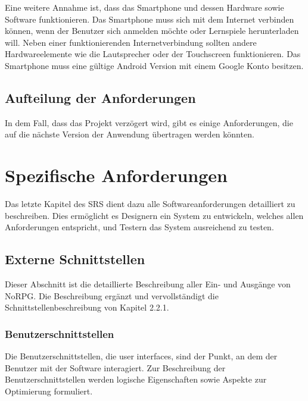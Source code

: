 		Eine weitere Annahme ist, dass das Smartphone und dessen Hardware sowie Software funktionieren. Das Smartphone muss sich mit dem Internet verbinden können, wenn der Benutzer sich anmelden möchte oder Lernspiele herunterladen will. Neben einer funktionierenden Internetverbindung sollten andere Hardwareelemente wie die Lautsprecher oder der Touchscreen funktionieren. Das Smartphone muss eine gültige Android Version mit einem Google Konto besitzen.
		
	\subsection{Aufteilung der Anforderungen}
		In dem Fall, dass das Projekt verzögert wird, gibt es einige Anforderungen, die auf die nächste Version der Anwendung übertragen werden könnten.

\section{Spezifische Anforderungen}
	Das letzte Kapitel des SRS dient dazu alle Softwareanforderungen detailliert zu beschreiben. Dies ermöglicht es Designern ein System zu entwickeln, welches allen Anforderungen entspricht, und Testern das System ausreichend zu testen.
	
	\subsection{Externe Schnittstellen}
		Dieser Abschnitt ist die detaillierte Beschreibung aller Ein- und Ausgänge von NoRPG. Die Beschreibung ergänzt und vervollständigt die Schnittstellenbeschreibung von Kapitel 2.2.1. 
	
		
		\subsubsection{Benutzerschnittstellen}
			Die Benutzerschnittstellen, die user interfaces, sind der Punkt, an dem der Benutzer mit der Software interagiert. Zur Beschreibung der Benutzerschnittstellen werden logische Eigenschaften sowie Aspekte zur Optimierung formuliert.
			
